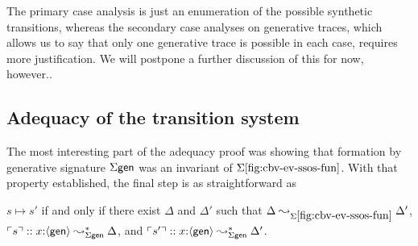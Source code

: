 The primary case analysis is just an enumeration of the possible
synthetic transitions, whereas the secondary case analyses on
generative traces, which allows us to say that only one generative
trace is possible in each case, requires more justification. We will
postpone a further discussion of this for now, however..

\subsection{Adequacy of the transition system}
\label{sec:nat-ssos-adequacy-absmachine}

The most interesting part of the adequacy proof was showing that
formation by generative signature $\Sigma\sf gen$ was an invariant of
$\Sigma\ref{fig:cbv-ev-ssos-fun}$. With that property established, the
final step is as straightforward as 

\bigskip
\begin{theorem}
$s \mapsto s'$ if and only if there exist $\Delta$ and $\Delta'$
such that
$\Delta \leadsto_{\Sigma\ref{fig:cbv-ev-ssos-fun}} \Delta'$,
${\ulcorner{s}\urcorner} :: x{:}\langle {\sf gen} \rangle \leadsto^*_{\Sigma\sf gen} \Delta$, and
${\ulcorner{s'}\urcorner} :: x{:}\langle {\sf gen} \rangle \leadsto^*_{\Sigma\sf gen} \Delta'$. 
\end{theorem}

